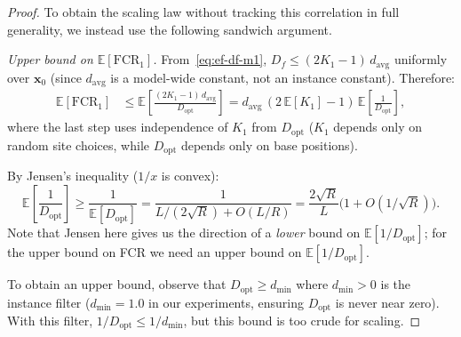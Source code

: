 \begin{proof}
To obtain the scaling law without tracking this correlation in full
generality, we instead use the following sandwich argument.

\emph{Upper bound on $\mathbb{E}[\mathrm{FCR}_1]$.}
From~\eqref{eq:ef-df-m1}, $D_f \leq (2K_1 - 1)\,d_{\mathrm{avg}}$
uniformly over $\mathbf{x}_0$ (since $d_{\mathrm{avg}}$ is a
model-wide constant, not an instance constant).
Therefore:
\begin{align}
  \mathbb{E}[\mathrm{FCR}_1]
  &\leq \mathbb{E}\!\left[
      \frac{(2K_1-1)\,d_{\mathrm{avg}}}{D_{\mathrm{opt}}}
    \right]
  = d_{\mathrm{avg}}\,(2\,\mathbb{E}[K_1]-1)\,\mathbb{E}\!\left[\frac{1}{D_{\mathrm{opt}}}\right],
  \label{eq:fcr-upper}
\end{align}
where the last step uses independence of $K_1$ from $D_{\mathrm{opt}}$
($K_1$ depends only on random site choices, while $D_{\mathrm{opt}}$
depends only on base positions).

By Jensen's inequality ($1/x$ is convex):
\begin{equation}\label{eq:jensen-recip}
  \mathbb{E}\!\left[\frac{1}{D_{\mathrm{opt}}}\right]
  \geq \frac{1}{\mathbb{E}[D_{\mathrm{opt}}]}
  = \frac{1}{L/(2\sqrt{R}) + O(L/R)}
  = \frac{2\sqrt{R}}{L}\bigl(1 + O(1/\sqrt{R})\bigr).
\end{equation}
Note that Jensen here gives us the direction of a \emph{lower} bound on
$\mathbb{E}[1/D_{\mathrm{opt}}]$; for the upper bound on FCR we need an
upper bound on $\mathbb{E}[1/D_{\mathrm{opt}}]$.

To obtain an upper bound, observe that $D_{\mathrm{opt}} \geq d_{\min}$
where $d_{\min} > 0$ is the instance filter ($d_{\min} = 1.0$ in our
experiments, ensuring $D_{\mathrm{opt}}$ is never near zero).
With this filter, $1/D_{\mathrm{opt}} \leq 1/d_{\min}$, but this bound
is too crude for scaling.


\end{proof}
